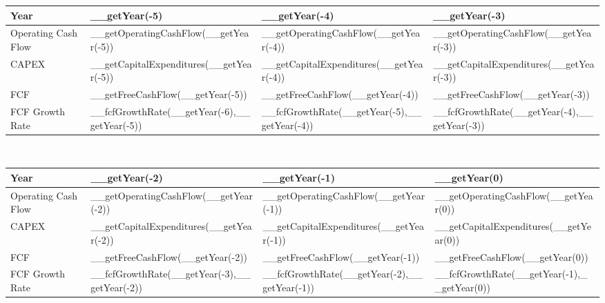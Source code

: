 \begin{tabularx}{\textwidth}{|X|X|X|X|}
 \hline
 Year                                 & __getYear(-5)                                 & __getYear(-4)                                 & __getYear(-3)                                 \\
 \hline
 Operating Cash Flow                  & __getOperatingCashFlow(__getYear(-5))         & __getOperatingCashFlow(__getYear(-4))         & __getOperatingCashFlow(__getYear(-3))         \\
 CAPEX                                & __getCapitalExpenditures(__getYear(-5))       & __getCapitalExpenditures(__getYear(-4))       & __getCapitalExpenditures(__getYear(-3))       \\
 FCF                                  & __getFreeCashFlow(__getYear(-5))              & __getFreeCashFlow(__getYear(-4))              & __getFreeCashFlow(__getYear(-3))              \\
 \rowcolor{lightgray} FCF Growth Rate & __fcfGrowthRate(__getYear(-6),__getYear(-5))  & __fcfGrowthRate(__getYear(-5),__getYear(-4))  & __fcfGrowthRate(__getYear(-4),__getYear(-3))  \\
 \hline
\end{tabularx}\\

\begin{tabularx}{\textwidth}{|X|X|X|X|}
 \hline
 Year                                 & __getYear(-2)                                 & __getYear(-1)                                 & __getYear(0)                                 \\
 \hline
 Operating Cash Flow                  & __getOperatingCashFlow(__getYear(-2))         & __getOperatingCashFlow(__getYear(-1))         & __getOperatingCashFlow(__getYear(0))         \\
 CAPEX                                & __getCapitalExpenditures(__getYear(-2))       & __getCapitalExpenditures(__getYear(-1))       & __getCapitalExpenditures(__getYear(0))       \\
 FCF                                  & __getFreeCashFlow(__getYear(-2))              & __getFreeCashFlow(__getYear(-1))              & __getFreeCashFlow(__getYear(0))              \\
 \rowcolor{lightgray} FCF Growth Rate & __fcfGrowthRate(__getYear(-3),__getYear(-2))  & __fcfGrowthRate(__getYear(-2),__getYear(-1))  & __fcfGrowthRate(__getYear(-1),__getYear(0))  \\
 \hline
\end{tabularx}\\

